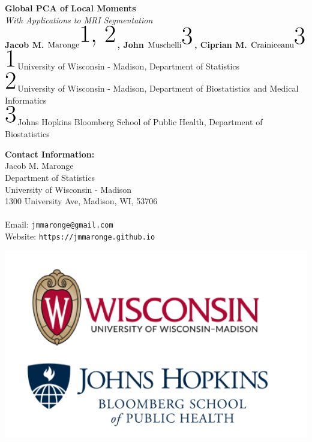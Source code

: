 \documentclass[a0,landscape]{a0poster}
\begin{document}


\begin{minipage}[b]{0.55\linewidth}
\veryHuge \color{uwred} \textbf{Global PCA of Local Moments} \color{Black}\\ %
\Huge\textit{With Applications to MRI Segmentation}\\[1cm] %
\huge \textbf{Jacob M. $\text{Maronge}^{\text{\large1, 2}}$, John $\text{Muschelli}^{\text{\large3}}$, Ciprian M. $\text{Crainiceanu}^{\text{\large3}}$}\\ %
\LARGE $^{\text{\large1}}$University of Wisconsin - Madison, Department of Statistics\\
\LARGE $^{\text{\large2}}$University of Wisconsin - Madison, Department of Biostatistics and Medical Informatics\\  %
\LARGE $^{\text{\large3}}$Johns Hopkins Bloomberg School of Public Health, Department of Biostatistics
\end{minipage}
%
\begin{minipage}[b]{0.25\linewidth}
\color{DarkSlateGray}\Large \textbf{Contact Information:}\\
Jacob M. Maronge\\
Department of Statistics\\ %
University of Wisconsin - Madison\\
1300 University Ave, Madison, WI, 53706\\\\
Email: \texttt{jmmaronge@gmail.com}\\ %
Website: \texttt{https://jmmaronge.github.io}
\end{minipage}
%
\begin{minipage}[b]{0.19\linewidth}
\includegraphics[width=23cm]{logo.png} %
\end{minipage}
\end{document}
